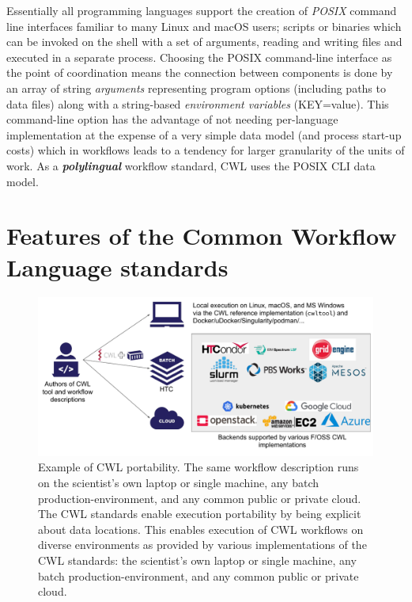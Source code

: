 \documentclass[sigconf,authordraft]{acmart}
\begin{document}
Essentially all programming languages support the creation of \textit{POSIX}
command line interfaces familiar to many Linux and macOS users; scripts or binaries which can be invoked on the shell with a set of arguments, reading and writing files and executed in a separate process. Choosing the POSIX command-line interface as the point of coordination means the connection between components is done by an array of string \textit{arguments} representing program options (including paths to data files) along with a string-based \textit{environment variables} (KEY=value). This command-line option has the advantage of not needing per-language implementation at the expense of a very simple data model (and process start-up costs) which in workflows leads to a tendency for larger granularity of the units of work. As a \textit{\textbf{polylingual}} workflow standard, CWL uses the POSIX CLI data model.

\section{Features of the Common Workflow Language standards}

\begin{figure}
  \centering
  \includegraphics[width=\textwidth]{figure2}
  \caption{Example of CWL portability. The same workflow description runs on the scientist's own laptop or single machine, any batch production-environment, and any common public or private cloud. The CWL standards enable execution portability by being explicit about data locations. This enables execution of CWL workflows on diverse environments as provided by various implementations of the CWL standards: the scientist's own laptop or single machine, any batch production-environment, and any common public or private cloud.}
  \label{fig:portability}
\end{figure}
\end{document}
